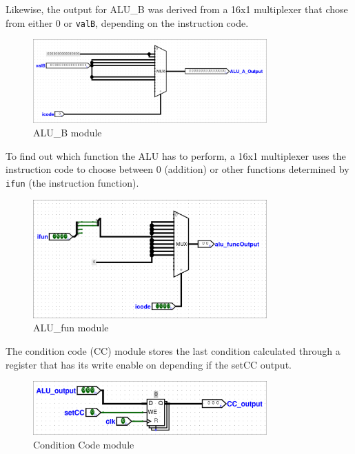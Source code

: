 \documentclass{article}
\begin{document}
Likewise, the output for ALU\_B was derived from a 16x1 multiplexer that chose from either 0 or \lstinline{valB}, depending on the instruction code. 

\begin{figure}[H]
    \centering
    \includegraphics[width=0.8\textwidth]{./images/alu_b.png}
    \caption{ALU\_B module}
\end{figure}

To find out which function the ALU has to perform, a 16x1 multiplexer uses the instruction code to choose between 0 (addition) or other functions determined by \lstinline{ifun} (the instruction function).

\begin{figure}[H]
    \centering
    \includegraphics[width=0.8\textwidth]{./images/alu_fun.png}
    \caption{ALU\_fun module}
\end{figure}

The condition code (CC) module stores the last condition calculated through a register that has its write enable on depending if the setCC output.

\begin{figure}[H]
    \centering
    \includegraphics[width=0.8\textwidth]{./images/cc.png}
    \caption{Condition Code module}
\end{figure}
\end{document}
